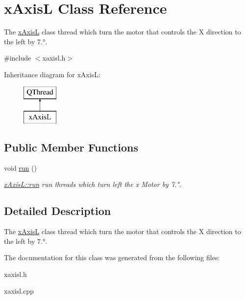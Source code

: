 \hypertarget{classx_axis_l}{}\section{x\+AxisL Class Reference}
\label{classx_axis_l}


The \mbox{\hyperlink{classx_axis_l}{x\+AxisL}} class thread which turn the motor that controls the X direction to the left by 7.°.  




{\ttfamily \#include $<$xaxisl.\+h$>$}

Inheritance diagram for x\+AxisL\+:\begin{figure}[H]
\begin{center}
\leavevmode
\includegraphics[height=2.000000cm]{classx_axis_l}
\end{center}
\end{figure}
\subsection*{Public Member Functions}
\begin{DoxyCompactItemize}
\item 
\mbox{\label{classx_axis_l_af7caf98e4e1527edfd67443b950146a3}} 
void \mbox{\hyperlink{classx_axis_l_af7caf98e4e1527edfd67443b950146a3}{run}} ()
\begin{DoxyCompactList}\small\item\em \mbox{\hyperlink{classx_axis_l_af7caf98e4e1527edfd67443b950146a3}{x\+Axis\+L\+::run}} run threads which turn left the x Motor by 7.°. \end{DoxyCompactList}\end{DoxyCompactItemize}


\subsection{Detailed Description}
The \mbox{\hyperlink{classx_axis_l}{x\+AxisL}} class thread which turn the motor that controls the X direction to the left by 7.°. 

The documentation for this class was generated from the following files\+:\begin{DoxyCompactItemize}
\item 
xaxisl.\+h\item 
xaxisl.\+cpp\end{DoxyCompactItemize}
